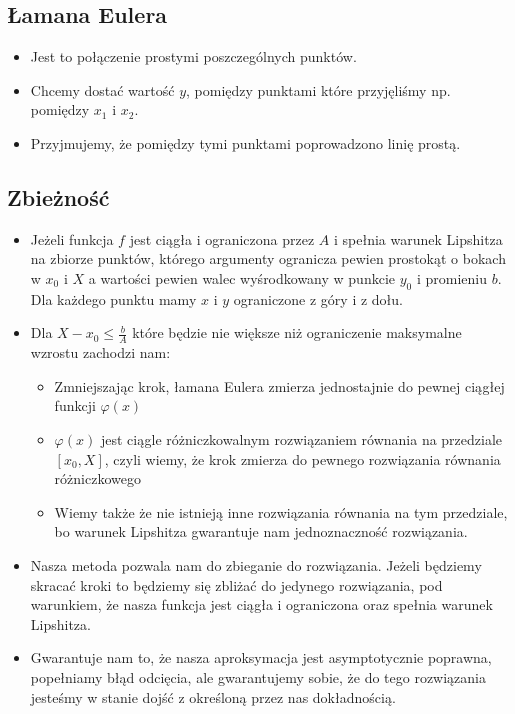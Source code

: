 \documentclass[a4paper]{article}
\begin{document}
\subsection{Łamana Eulera}
\begin{itemize}
    \item Jest to połączenie prostymi poszczególnych punktów.
    \item Chcemy dostać wartość $y$, pomiędzy punktami które przyjęliśmy np. pomiędzy $x_1$ i $x_2$.
    \item Przyjmujemy, że pomiędzy tymi punktami poprowadzono linię prostą.
\end{itemize}

\subsection{Zbieżność}
\begin{itemize}
    \item Jeżeli funkcja $f$ jest ciągła i ograniczona przez $A$ i spełnia warunek Lipshitza na zbiorze punktów, którego argumenty ogranicza pewien prostokąt o bokach w $x_0$ i $X$ a wartości pewien walec wyśrodkowany w punkcie $y_0$ i promieniu $b$. Dla każdego punktu mamy $x$ i $y$ ograniczone z góry i z dołu.
    \item Dla $X - x_0 \leq \frac{b}{A}$ które będzie nie większe niż ograniczenie maksymalne wzrostu zachodzi nam:
    \begin{itemize}
        \item Zmniejszając krok, łamana Eulera zmierza jednostajnie do pewnej ciągłej funkcji $\varphi(x)$ 
        \item $\varphi(x)$ jest ciągle różniczkowalnym rozwiązaniem równania na przedziale $[x_0, X]$, czyli wiemy, że krok zmierza do pewnego rozwiązania równania różniczkowego
    \item Wiemy także że nie istnieją inne rozwiązania równania na tym przedziale, bo warunek Lipshitza gwarantuje nam jednoznaczność rozwiązania.
    \end{itemize}
    \item Nasza metoda pozwala nam do zbieganie do rozwiązania. Jeżeli będziemy skracać kroki to będziemy się zbliżać do jedynego rozwiązania, pod warunkiem, że nasza funkcja jest ciągła i ograniczona oraz spełnia warunek Lipshitza.
    \item Gwarantuje nam to, że nasza aproksymacja jest asymptotycznie poprawna, popełniamy błąd odcięcia, ale gwarantujemy sobie, że do tego rozwiązania jesteśmy w stanie dojść z określoną przez nas dokładnością.
\end{itemize}
\end{document}
